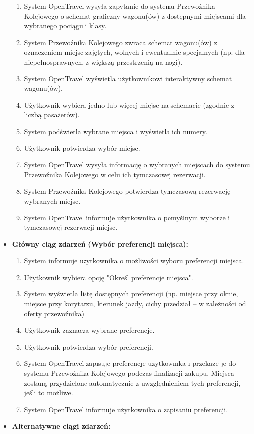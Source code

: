 \documentclass[a4paper,12pt]{article}
\begin{document}
\begin{itemize}
\begin{enumerate}
\item System OpenTravel wysyła zapytanie do systemu Przewoźnika Kolejowego o schemat graficzny wagonu(ów) z dostępnymi miejscami dla wybranego pociągu i klasy.
\item System Przewoźnika Kolejowego zwraca schemat wagonu(ów) z oznaczeniem miejsc zajętych, wolnych i ewentualnie specjalnych (np. dla niepełnosprawnych, z większą przestrzenią na nogi).
\item System OpenTravel wyświetla użytkownikowi interaktywny schemat wagonu(ów).
\item Użytkownik wybiera jedno lub więcej miejsc na schemacie (zgodnie z liczbą pasażerów).
\item System podświetla wybrane miejsca i wyświetla ich numery.
\item Użytkownik potwierdza wybór miejsc.
\item System OpenTravel wysyła informację o wybranych miejscach do systemu Przewoźnika Kolejowego w celu ich tymczasowej rezerwacji.
\item System Przewoźnika Kolejowego potwierdza tymczasową rezerwację wybranych miejsc.
\item System OpenTravel informuje użytkownika o pomyślnym wyborze i tymczasowej rezerwacji miejsc.
\end{enumerate}
\item \textbf{Główny ciąg zdarzeń (Wybór preferencji miejsca):}
\begin{enumerate}
\item System informuje użytkownika o możliwości wyboru preferencji miejsca.
\item Użytkownik wybiera opcję "Określ preferencje miejsca".
\item System wyświetla listę dostępnych preferencji (np. miejsce przy oknie, miejsce przy korytarzu, kierunek jazdy, cichy przedział – w zależności od oferty przewoźnika).
\item Użytkownik zaznacza wybrane preferencje.
\item Użytkownik potwierdza wybór preferencji.
\item System OpenTravel zapisuje preferencje użytkownika i przekaże je do systemu Przewoźnika Kolejowego podczas finalizacji zakupu. Miejsca zostaną przydzielone automatycznie z uwzględnieniem tych preferencji, jeśli to możliwe.
\item System OpenTravel informuje użytkownika o zapisaniu preferencji.
\end{enumerate}
\item \textbf{Alternatywne ciągi zdarzeń:}

\end{itemize}
\end{document}
